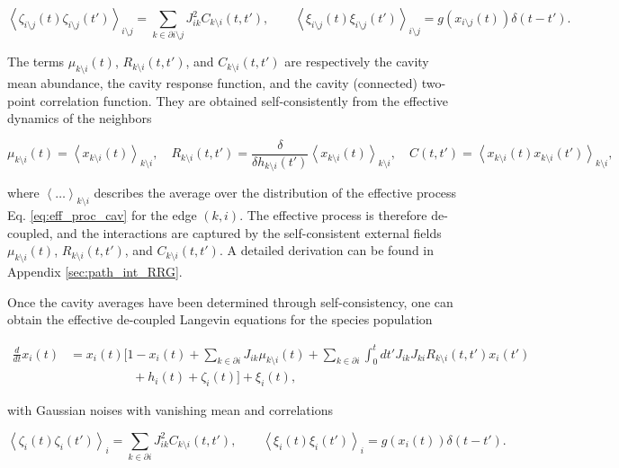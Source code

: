 \documentclass[
    preprint,
    linenumbers,
    amsmath,amssymb,amsfonts,
    aps, physrev,
    superscriptaddress,
    10pt,
    bibnotes
    ]{revtex4-2}
\begin{document}
\begin{equation}
  \left\langle \zeta_{i\setminus j}(t)\zeta_{i\setminus j}(t')\right\rangle _{i\setminus j}=\sum_{k\in\partial i\setminus j}J_{ik}^{2}C_{k\setminus i}(t,t'),\qquad\left\langle \xi_{i\setminus j}(t)\xi_{i\setminus j}(t')\right\rangle _{i\setminus j}=g(x_{i\setminus j}(t))\delta(t-t').
\end{equation}

The terms $\mu_{k\setminus i}(t)$, $R_{k\setminus i}(t,t')$, and $C_{k\setminus i}(t,t')$ are respectively the cavity mean abundance, the cavity response function, and the cavity (connected) two-point correlation function. They are obtained self-consistently from the effective dynamics of the neighbors

\begin{equation}
\mu_{k\setminus i}(t)=\left\langle x_{k\setminus i}(t)\right\rangle _{k\setminus i},\quad R_{k\setminus i}(t,t')=\frac{\delta}{\delta h_{k\setminus i}(t')}\left\langle x_{k\setminus i}(t)\right\rangle _{k\setminus i},\quad C(t,t')=\left\langle x_{k\setminus i}(t)x_{k\setminus i}(t')\right\rangle _{k\setminus i},
\end{equation}

where $\left\langle \dots\right\rangle _{k\setminus i}$ describes the average over the distribution of the effective process Eq. \eqref{eq:eff_proc_cav} for the edge $(k,i)$. The effective process is therefore de-coupled, and the interactions are captured by the self-consistent external fields $\mu_{k\setminus i}(t)$, $R_{k\setminus i}(t,t')$, and $C_{k\setminus i}(t,t')$. A detailed derivation can be found in Appendix \ref{sec:path_int_RRG}.

Once the cavity averages have been determined through self-consistency, one can obtain the effective de-coupled Langevin equations for the species population

\begin{align}
  \frac{d}{dt}x_{i}(t) & =x_{i}(t)\Biggl[1-x_{i}(t)+\sum_{k\in\partial i}J_{ik}\mu_{k\setminus i}(t) + \sum_{k\in\partial i}\int_{0}^{t}dt'J_{ik}J_{ki}R_{k\setminus i}(t,t')x_{i}(t') \nonumber \\
   & \qquad\quad \qquad +h_{i}(t)+\zeta_{i}(t)\Biggr]+\xi_{i}(t),\label{eq:eff_proc_marg}
\end{align}

with Gaussian noises with vanishing mean and correlations

\begin{equation}
  \left\langle \zeta_{i}(t)\zeta_{i}(t')\right\rangle _{i}=\sum_{k\in\partial i}J_{ik}^{2}C_{k\setminus i}(t,t'),\qquad\left\langle \xi_{i}(t)\xi_{i}(t')\right\rangle _{i}=g(x_{i}(t))\delta(t-t').
\end{equation}
\end{document}
